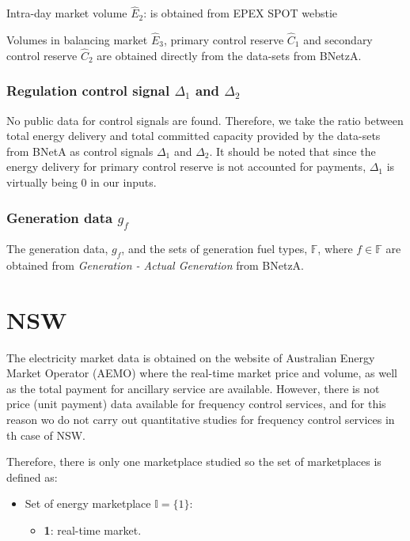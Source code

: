 Intra-day market volume $\hat{E}_2$: is obtained from EPEX SPOT webstie

Volumes in balancing market  $\hat{E}_3$, primary control reserve $\hat{C}_1$ and secondary control reserve $\hat{C}_2$ are obtained directly from the data-sets from BNetzA.

\subsubsection{Regulation control signal $\Delta_1$ and $\Delta_2$}

No public data for control signals are found. Therefore, we take the ratio between total energy delivery and total committed capacity provided by the data-sets from BNetA as control signals $\Delta_1$ and $\Delta_2$. It should be noted that since the energy delivery for primary control reserve is not accounted for payments, $\Delta_1$ is virtually being 0 in our inputs.

\subsubsection{Generation data $g_{f}$}

The generation data, $g_{f}$, and the sets of generation fuel types, $\mathbb{F}$, where $f \in \mathbb{F}$ are obtained from \textit{Generation - Actual Generation} from BNetzA.

\section{NSW}

The electricity market data is obtained on the website of Australian Energy Market Operator (AEMO) where the real-time market price and volume, as well as the total payment for ancillary service are available. However, there is not price (unit payment) data available for frequency control services, and for this reason wo do not carry out quantitative studies for frequency control services in th case of NSW. 

Therefore, there is only one marketplace studied so the set of marketplaces is defined as:

\begin{itemize}
	\item Set of energy marketplace $\mathbb{I} = \{1\}$:
	\begin{itemize}
		\item \textbf{1}: real-time market.
	\end{itemize}
\end{itemize}

